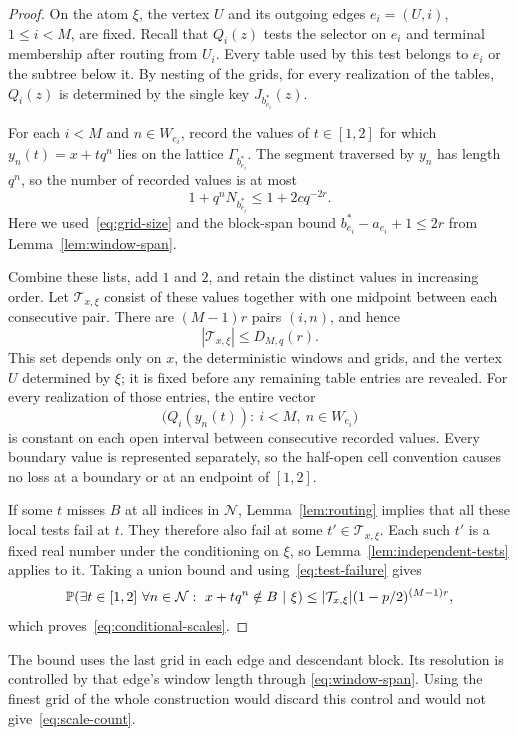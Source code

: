 \begin{proof}
On the atom $\xi$, the vertex $U$ and its outgoing edges
$e_i=(U,i)$, $1\le i<M$, are fixed.  Recall that
$Q_i(z)$ tests the selector on $e_i$ and terminal membership after
routing from $U_i$.  Every table used by this test belongs to $e_i$
or the subtree below it.  By nesting of the grids, for every realization
of the tables, $Q_i(z)$ is determined by the single key
$J_{b_{e_i}^*}(z)$.

For each $i<M$ and $n\in W_{e_i}$, record the values of $t\in[1,2]$
for which $y_n(t)=x+tq^n$ lies on the lattice
$\Gamma_{b_{e_i}^*}$.  The segment traversed by $y_n$ has length
$q^n$, so the number of recorded values is at most
\begin{equation}\label{eq:local-boundaries}
 1+q^nN_{b_{e_i}^*}
 \le 1+2c q^{-2r}.
\end{equation}
Here we used~\eqref{eq:grid-size} and the block-span bound
$b_{e_i}^*-a_{e_i}+1\le2r$ from
Lemma~\ref{lem:window-span}.

Combine these lists, add $1$ and $2$, and retain the distinct values in
increasing order.  Let $\mathcal T_{x,\xi}$ consist of these values
together with one midpoint between each consecutive pair.  There are
$(M-1)r$ pairs $(i,n)$, and hence
\[
 |\mathcal T_{x,\xi}|\le D_{M,q}(r).
\]
This set depends only on $x$, the deterministic windows and grids, and
the vertex $U$ determined by $\xi$; it is fixed before any remaining
table entries are revealed.  For every realization of those entries,
the entire vector
\[
 \bigl(Q_i(y_n(t)):\ i<M,\ n\in W_{e_i}\bigr)
\]
is constant on each open interval between consecutive recorded values.
Every boundary value is represented separately, so the half-open cell
convention causes no loss at a boundary or at an endpoint of $[1,2]$.

If some $t$ misses $B$ at all indices in $\mathcal N$,
Lemma~\ref{lem:routing} implies that all these local tests fail at $t$.
They therefore also fail at some $t'\in\mathcal T_{x,\xi}$.
Each such $t'$ is a fixed real number under the conditioning on $\xi$,
so Lemma~\ref{lem:independent-tests} applies to it.  Taking a union
bound and using~\eqref{eq:test-failure} gives
\[
 \mathbb P\!\left(
  \exists t\in[1,2]\ \forall n\in\mathcal N:\
  x+tq^n\notin B\ \middle|\ \xi
 \right)
 \le |\mathcal T_{x,\xi}|(1-p/2)^{(M-1)r},
\]
which proves~\eqref{eq:conditional-scales}.
\end{proof}

The bound uses the last grid in each edge and descendant block.
Its resolution is controlled by that edge's window length through
\eqref{eq:window-span}.  Using the finest grid of the whole construction
would discard this control and would not give~\eqref{eq:scale-count}.

